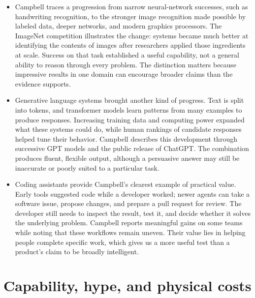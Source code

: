 \documentclass[10pt]{article}
\begin{document}
\begin{itemize}[leftmargin=1.25em, itemsep=0.3em, parsep=0pt, topsep=0pt]
    \item Campbell traces a progression from narrow neural-network successes, such as handwriting recognition, to the stronger image recognition made possible by labeled data, deeper networks, and modern graphics processors. The ImageNet competition illustrates the change: systems became much better at identifying the contents of images after researchers applied those ingredients at scale. Success on that task established a useful capability, not a general ability to reason through every problem. The distinction matters because impressive results in one domain can encourage broader claims than the evidence supports.

    \item Generative language systems brought another kind of progress. Text is split into tokens, and transformer models learn patterns from many examples to produce responses. Increasing training data and computing power expanded what these systems could do, while human rankings of candidate responses helped tune their behavior. Campbell describes this development through successive GPT models and the public release of ChatGPT. The combination produces fluent, flexible output, although a persuasive answer may still be inaccurate or poorly suited to a particular task.

    \item Coding assistants provide Campbell's clearest example of practical value. Early tools suggested code while a developer worked; newer agents can take a software issue, propose changes, and prepare a pull request for review. The developer still needs to inspect the result, test it, and decide whether it solves the underlying problem. Campbell reports meaningful gains on some teams while noting that these workflows remain uneven. Their value lies in helping people complete specific work, which gives us a more useful test than a product's claim to be broadly intelligent.
\end{itemize}

\newpage
\section*{Capability, hype, and physical costs}
\end{document}
